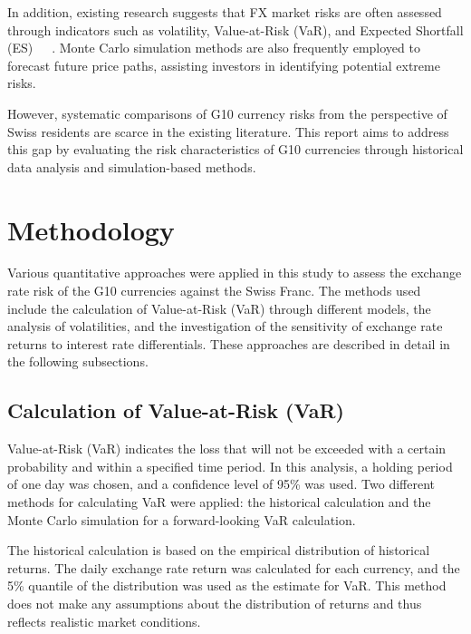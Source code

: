 \documentclass{article}
\begin{document}
In addition, existing research suggests that FX market risks are often assessed through indicators such as volatility, Value-at-Risk (VaR), and Expected Shortfall (ES)~\cite{AUBOIN_RUTA_2013}~\cite{dollar_exchange}~\cite{riker2020review}. Monte Carlo simulation methods are also frequently employed to forecast future price paths, assisting investors in identifying potential extreme risks.

However, systematic comparisons of G10 currency risks from the perspective of Swiss residents are scarce in the existing literature. This report aims to address this gap by evaluating the risk characteristics of G10 currencies through historical data analysis and simulation-based methods.

\section{Methodology}

Various quantitative approaches were applied in this study to assess the exchange rate risk of the G10 currencies against the Swiss Franc. The methods used include the calculation of Value-at-Risk (VaR) through different models, the analysis of volatilities, and the investigation of the sensitivity of exchange rate returns to interest rate differentials. These approaches are described in detail in the following subsections.

\subsection{Calculation of Value-at-Risk (VaR)}

Value-at-Risk (VaR) indicates the loss that will not be exceeded with a certain probability and within a specified time period. In this analysis, a holding period of one day was chosen, and a confidence level of 95\% was used. Two different methods for calculating VaR were applied: the historical calculation and the Monte Carlo simulation for a forward-looking VaR calculation.

The historical calculation is based on the empirical distribution of historical returns. The daily exchange rate return was calculated for each currency, and the 5\% quantile of the distribution was used as the estimate for VaR. This method does not make any assumptions about the distribution of returns and thus reflects realistic market conditions.
\end{document}
